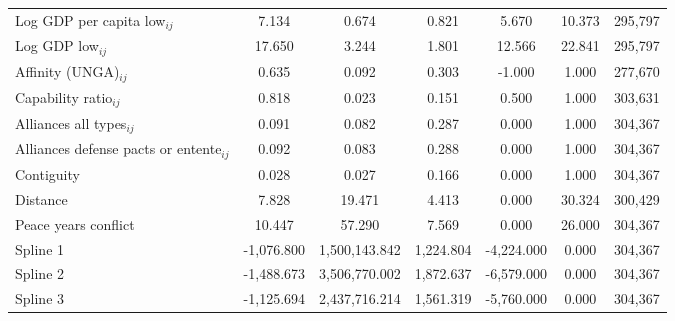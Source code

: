 \begin{table}[htbp]
\begin{tabular}{l*{1}{cccccc}}
Log GDP per capita low$_{ij}$ &       7.134&       0.674&       0.821&       5.670&      10.373&      295,797\\
Log GDP low$_{ij}$    &      17.650&       3.244&       1.801&      12.566&      22.841&      295,797\\
Affinity (UNGA)$_{ij}$    &       0.635&       0.092&       0.303&      -1.000&       1.000&      277,670\\
Capability ratio$_{ij}$    &       0.818&       0.023&       0.151&       0.500&       1.000&      303,631\\
Alliances all types$_{ij}$    &       0.091&       0.082&       0.287&       0.000&       1.000&      304,367\\
Alliances defense pacts or entente$_{ij}$     &       0.092&       0.083&       0.288&       0.000&       1.000&      304,367\\
Contiguity   &       0.028&       0.027&       0.166&       0.000&       1.000&      304,367\\
Distance   &    7.828 &19.471&    4.413&       0.000&   30.324&      300,429\\
Peace years conflict    &      10.447&      57.290&       7.569&       0.000&      26.000&      304,367\\
Spline 1    &   -1,076.800& 1,500,143.842&    1,224.804&   -4,224.000&       0.000&      304,367\\
Spline 2    &   -1,488.673& 3,506,770.002&    1,872.637&   -6,579.000&       0.000&      304,367\\
Spline 3    &   -1,125.694& 2,437,716.214&    1,561.319&   -5,760.000&       0.000&      304,367\\
\bottomrule
\end{tabular}
\end{table}
